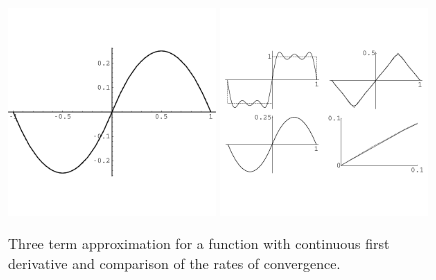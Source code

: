 \begin{Example}
  \begin{figure}[h!]
    \begin{center}
      \includegraphics[width=0.49\textwidth]{ode/fourier_series/cont2}
      \includegraphics[width=0.49\textwidth]{ode/fourier_series/cont0124}
    \end{center}
    \caption{Three term approximation for a function with continuous
      first derivative and comparison of the rates of convergence.}
    \label{cont0124}
  \end{figure}



\end{Example}
